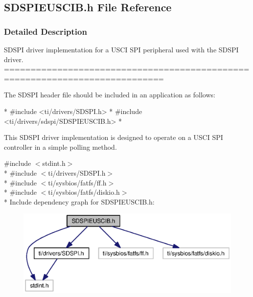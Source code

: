\subsection{S\-D\-S\-P\-I\-E\-U\-S\-C\-I\-B.\-h File Reference}
\label{_s_d_s_p_i_e_u_s_c_i_b_8h}


\subsubsection{Detailed Description}
S\-D\-S\-P\-I driver implementation for a U\-S\-C\-I S\-P\-I peripheral used with the S\-D\-S\-P\-I driver. ============================================================================

The S\-D\-S\-P\-I header file should be included in an application as follows\-: 
\begin{DoxyCode}
*  #include <ti/drivers/SDSPI.h>
*  #include <ti/drivers/sdspi/SDSPIEUSCIB.h>
*  
\end{DoxyCode}


This S\-D\-S\-P\-I driver implementation is designed to operate on a U\-S\-C\-I S\-P\-I controller in a simple polling method. 

{\ttfamily \#include $<$stdint.\-h$>$}\\*
{\ttfamily \#include $<$ti/drivers/\-S\-D\-S\-P\-I.\-h$>$}\\*
{\ttfamily \#include $<$ti/sysbios/fatfs/ff.\-h$>$}\\*
{\ttfamily \#include $<$ti/sysbios/fatfs/diskio.\-h$>$}\\*
Include dependency graph for S\-D\-S\-P\-I\-E\-U\-S\-C\-I\-B.\-h\-:
\nopagebreak
\begin{figure}[H]
\begin{center}
\leavevmode
\includegraphics[width=350pt]{_s_d_s_p_i_e_u_s_c_i_b_8h__incl}
\end{center}
\end{figure}
